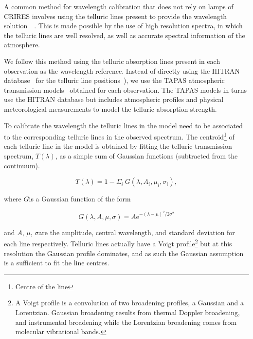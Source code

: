 A common method for wavelength calibration that does not rely on \thar{} lamps of CRIRES involves using the telluric lines present to provide the wavelength solution~\citep[e.g.][]{brogi_signature_2012,brogi_carbon_2014,dekok_detection_2013}{\red{}~\citep{piskorz_evidence_2016}}. This is made possible by the use of high resolution spectra, in which the telluric lines are well resolved, as well as accurate spectral information of the atmosphere.

We follow this method using the telluric absorption lines present in each observation as the wavelength reference. Instead of directly using the HITRAN database~\citep{rothman_hitran2012_2013} for the telluric line positions~\citet[such as in][]{brogi_signature_2012,brogi_carbon_2014,dekok_detection_2013}), we use the TAPAS atmospheric transmission models~\citep{bertaux_tapas_2014} obtained for each observation. The TAPAS models in turns use the HITRAN database but includes atmospheric profiles and physical meteorological measurements to model the telluric absorption strength.

To calibrate the wavelength the telluric lines in the model need to be associated to the corresponding telluric lines in the observed spectrum. The centroid\footnote{Centre of the line} of each telluric line in the model is obtained by fitting the telluric transmission spectrum, \(T(\lambda)\), as a simple sum of Gaussian functions (subtracted from the continuum).

\begin{equation}
T(\lambda) = 1 - {\Sigma}_{i}\ G(\lambda, A_{i}, {\mu}_{i}, {\sigma}_{i}),
\end{equation}

where \(G\)is a Gaussian function of the form

\begin{equation}
G(\lambda, A, \mu, \sigma) = {A \textrm{e}}^{{-(\lambda-\mu)}^{2}/2\sigma^{2}}
\end{equation}

and \(A\), \(\mu\), \(\sigma\)are the amplitude, central wavelength, and standard deviation for each line respectively. Telluric lines actually have a Voigt profile\footnote{A Voigt profile is a convolution of two broadening profiles, a Gaussian and a Lorentzian. Gaussian broadening results from thermal Doppler broadening, and instrumental broadening while the Lorentzian broadening comes from molecular vibrational bands\citep{meier_art_2005}.} but at this resolution the Gaussian profile dominates, and as such the Gaussian assumption is a sufficient to fit the line centres.


